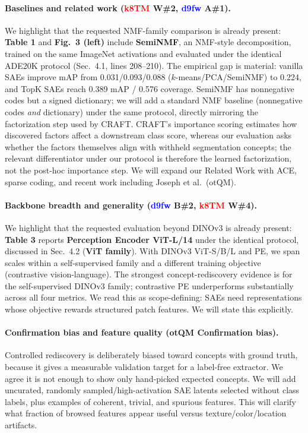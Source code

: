 \documentclass[10pt,twocolumn,letterpaper]{article}
\newcommand{\kTM}{\textcolor{red}{k8TM}}
\newcommand{\dfw}{\textcolor{blue}{d9fw}}
\newcommand{\otQM}{\textcolor{reviewgreen}{otQM}}
\begin{document}
\paragraph{Baselines and related work (\kTM{} W\#2, \dfw{} A\#1).}
We highlight that the requested NMF-family comparison is already present: \textbf{Table 1} and \textbf{Fig.\ 3 (left)} include \textbf{SemiNMF}, an NMF-style decomposition, trained on the same ImageNet activations and evaluated under the identical ADE20K protocol (Sec.\ 4.1, lines 208--210).
The empirical gap is material: vanilla SAEs improve mAP from 0.031/0.093/0.088 ($k$-means/PCA/SemiNMF) to 0.224, and TopK SAEs reach 0.389 mAP / 0.576 coverage.
SemiNMF has nonnegative codes but a signed dictionary; we will add a standard NMF baseline (nonnegative codes \emph{and} dictionary) under the same protocol, directly mirroring the factorization step used by CRAFT.
CRAFT's importance scoring estimates how discovered factors affect a downstream class score, whereas our evaluation asks whether the factors themselves align with withheld segmentation concepts; the relevant differentiator under our protocol is therefore the learned factorization, not the post-hoc importance step.
We will expand our Related Work with ACE, sparse coding, and recent work including Joseph et al.\ (\otQM{}).

\paragraph{Backbone breadth and generality (\dfw{} B\#2, \kTM{} W\#4).}
We highlight that the requested evaluation beyond DINOv3 is already present: \textbf{Table 3} reports \textbf{Perception Encoder ViT-L/14} under the identical protocol, discussed in Sec.\ 4.2 (\textbf{ViT family}).
With DINOv3 ViT-S/B/L and PE, we span scales within a self-supervised family and a different training objective (contrastive vision-language).
The strongest concept-rediscovery evidence is for the self-supervised DINOv3 family; contrastive PE underperforms substantially across all four metrics.
We read this as scope-defining: SAEs need representations whose objective rewards structured patch features. We will state this explicitly.

\paragraph{Confirmation bias and feature quality (\otQM{} \textbf{Confirmation bias}).}
Controlled rediscovery is deliberately biased toward concepts with ground truth, because it gives a measurable validation target for a label-free extractor.
We agree it is not enough to show only hand-picked expected concepts.
We will add uncurated, randomly sampled/high-activation SAE latents selected without class labels, plus examples of coherent, trivial, and spurious features.
This will clarify what fraction of browsed features appear useful versus texture/color/location artifacts.
\end{document}
